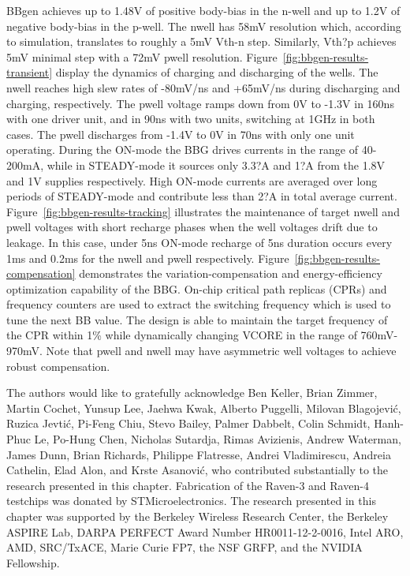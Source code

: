 \documentclass[graybox]{svmult}
\begin{document}
BBgen achieves up to 1.48V of positive body-bias in the n-well and up to 1.2V of negative body-bias in the p-well.
The nwell has 58mV resolution which, according to simulation, translates to roughly a 5mV Vth-n step.
Similarly, Vth?p achieves 5mV minimal step with a 72mV pwell resolution.
Figure~\ref{fig:bbgen-results-transient} display the dynamics of charging and discharging of the wells.
The nwell reaches high slew rates of -80mV/ns and +65mV/ns during discharging and charging, respectively.
The pwell voltage ramps down from 0V to -1.3V in 160ns with one driver unit, and in 90ns with two units, switching at 1GHz in both cases.
The pwell discharges from -1.4V to 0V in 70ns with only one unit operating.
During the ON-mode the BBG drives currents in the range of 40-200mA, while in STEADY-mode it sources only 3.3?A and 1?A from the 1.8V and 1V supplies respectively.
High ON-mode currents are averaged over long periods of STEADY-mode and contribute less than 2?A in total average current.
Figure~\ref{fig:bbgen-results-tracking} illustrates the maintenance of target nwell and pwell voltages with short recharge phases when the well voltages drift due to leakage.
In this case, under 5ns ON-mode recharge of 5ns duration occurs every 1ms and 0.2ms for the nwell and pwell respectively.
Figure~\ref{fig:bbgen-results-compensation} demonstrates the variation-compensation and energy-efficiency optimization capability of the BBG.
On-chip critical path replicas (CPRs) and frequency counters are used to extract the switching frequency which is used to tune the next BB value.
The design is able to maintain the target frequency of the CPR within 1\% while dynamically changing VCORE in the range of 760mV-970mV.
Note that pwell and nwell may have asymmetric well voltages to achieve robust compensation.



\begin{acknowledgement}
The authors would like to gratefully acknowledge Ben Keller, Brian Zimmer, Martin Cochet, Yunsup Lee, Jaehwa Kwak, Alberto Puggelli, Milovan Blagojevi\'{c}, Ruzica Jevti\'{c}, Pi-Feng Chiu, Stevo Bailey, Palmer Dabbelt, Colin Schmidt, Hanh-Phuc Le, Po-Hung Chen, Nicholas Sutardja, Rimas Avizienis, Andrew Waterman, James Dunn, Brian Richards, Philippe Flatresse, Andrei Vladimirescu, Andreia Cathelin, Elad Alon, and Krste Asanovi\'{c}, who contributed substantially to the research presented in this chapter.
Fabrication of the Raven-3 and Raven-4 testchips was donated by STMicroelectronics.
The research presented in this chapter was supported by the Berkeley Wireless Research Center, the Berkeley ASPIRE Lab, DARPA PERFECT Award Number HR0011-12-2-0016, Intel ARO, AMD, SRC/TxACE, Marie Curie FP7, the NSF GRFP, and the NVIDIA Fellowship.
\end{acknowledgement}



\printbibliography
\end{document}
